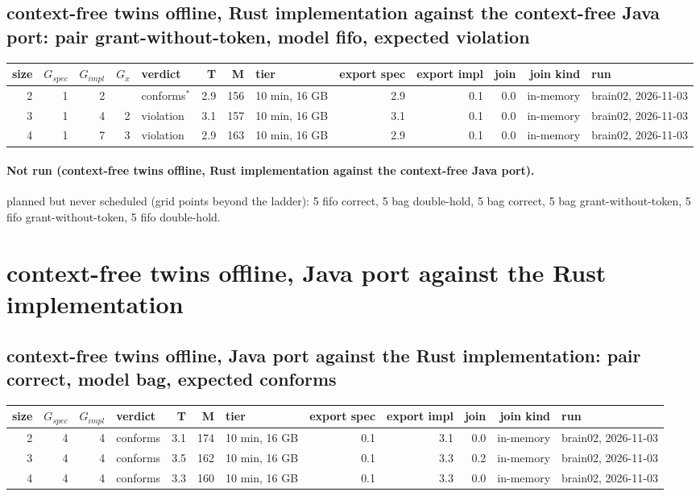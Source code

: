 \documentclass[10pt]{article}
\begin{document}
\subsection*{context-free twins offline, Rust implementation against the context-free Java port: pair \textsf{grant-without-token}, model fifo, expected violation}
\begin{longtable}{@{}rrrrlrrlrrrrl@{}}
\toprule
size & $G_{\mathit{spec}}$ & $G_{\mathit{impl}}$ & $G_x$ & verdict & T & M & tier & export spec & export impl & join & join kind & run \\
\midrule
\endhead
\color{red} 2 & 1 & 2 &  & conforms$^{\ast}$ & 2.9 & 156 & 10 min, 16 GB & 2.9 & 0.1 & 0.0 & in-memory & brain02, 2026-11-03 \\
\color{red} 3 & 1 & 4 & 2 & violation & 3.1 & 157 & 10 min, 16 GB & 3.1 & 0.1 & 0.0 & in-memory & brain02, 2026-11-03 \\
\color{red} 4 & 1 & 7 & 3 & violation & 2.9 & 163 & 10 min, 16 GB & 2.9 & 0.1 & 0.0 & in-memory & brain02, 2026-11-03 \\
\bottomrule
\end{longtable}
\paragraph{Not run (context-free twins offline, Rust implementation against the context-free Java port).}
planned but never scheduled (grid points beyond the ladder): 5 fifo correct, 5 bag double-hold, 5 bag correct, 5 bag grant-without-token, 5 fifo grant-without-token, 5 fifo double-hold.\par
\section*{context-free twins offline, Java port against the Rust implementation}
\subsection*{context-free twins offline, Java port against the Rust implementation: pair \textsf{correct}, model bag, expected conforms}
\begin{longtable}{@{}rrrlrrlrrrrl@{}}
\toprule
size & $G_{\mathit{spec}}$ & $G_{\mathit{impl}}$ & verdict & T & M & tier & export spec & export impl & join & join kind & run \\
\midrule
\endhead
\color{red} 2 & 4 & 4 & conforms & 3.1 & 174 & 10 min, 16 GB & 0.1 & 3.1 & 0.0 & in-memory & brain02, 2026-11-03 \\
\color{red} 3 & 4 & 4 & conforms & 3.5 & 162 & 10 min, 16 GB & 0.1 & 3.3 & 0.2 & in-memory & brain02, 2026-11-03 \\
\color{red} 4 & 4 & 4 & conforms & 3.3 & 160 & 10 min, 16 GB & 0.1 & 3.3 & 0.0 & in-memory & brain02, 2026-11-03 \\
\bottomrule
\end{longtable}
\end{document}
